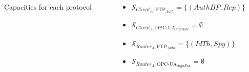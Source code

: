\documentclass{beamer}
\newcommand{\ftpauth}{FTP$_{Auth}$\xspace}
\newcommand{\opcuasignenc}{OPC-UA$_{SignEnc}$\xspace}
\begin{document}
\begin{frame}[fragile]{}
\begin{tcolorbox}[adjusted title={\centering\large Attack models}]
\begin{columns}[T]
\begin{column}{.65\textwidth}
\begin{tcolorbox}
\begin{columns}[c]
\begin{column}{.3\textwidth}
\begin{table}[htb]
                                \vspace{-.75em}
                                \caption{Capacities for each protocol}
                                \label{tab:ex_cap}
                            \end{table}
                        \end{column}
                        \hspace{.7cm}
                        \begin{column}{.4\textwidth}
                            \begin{itemize}
                                \item $\mathcal{S}_{Client_{A},\text{\ftpauth}} = \{ (AuthBP, Rep) \}$
                                \item $\mathcal{S}_{Client_{A},\text{\opcuasignenc}} = \emptyset$
                                \item $\mathcal{S}_{Router_{A},\text{\ftpauth}} = \{ (IdTh, Spy) \}$
                                \item $\mathcal{S}_{Router_{A},\text{\opcuasignenc}} = \emptyset$
                            \end{itemize}
                        \end{column}
                    \end{columns}
               \end{tcolorbox}
            \end{column}
        \end{columns}
    \end{tcolorbox}
    \vfill
\end{frame}
\end{document}
